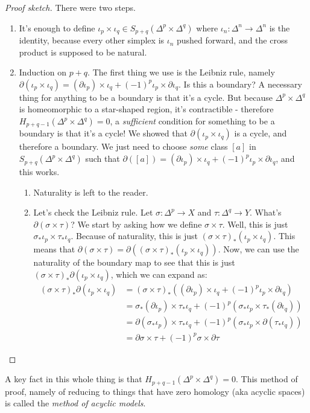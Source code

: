 \documentclass{amsart}
\theoremstyle{theorem}
\theoremstyle{definition}
\begin{document}
\begin{proof}[Proof sketch]
There were two steps.
\begin{enumerate}
\item It's enough to define $\iota_p\times \iota_q\in S_{p+q}(\Delta^p\times \Delta^q)$ where $\iota_n:\Delta^n\to\Delta^n$ is the identity, because every other simplex is $\iota_n$ pushed forward, and the cross product is supposed to be natural.
\item Induction on $p+q$. The first thing we use is the Leibniz rule, namely $\partial(\iota_p\times\iota_q) = (\partial\iota_p)\times\iota_q + (-1)^p\iota_p\times\partial\iota_q$. Is this a boundary? A necessary thing for anything to be a boundary is that it's a cycle. But because $\Delta^p\times\Delta^q$ is homeomorphic to a star-shaped region, it's contractible - therefore $ H_{p+q-1}(\Delta^p\times\Delta^q)=0$, a \emph{sufficient} condition for something to be a boundary is that it's a cycle! We showed that $\partial(\iota_p\times\iota_q)$ is a cycle, and therefore a boundary. We just need to choose \emph{some} class $[a]$ in $S_{p+q}(\Delta^p\times\Delta^q)$ such that $\partial([a])=(\partial\iota_p)\times\iota_q + (-1)^p\iota_p\times\partial\iota_q$, and this works.
\begin{enumerate}
\item Naturality is left to the reader.
\item Let's check the Leibniz rule. Let $\sigma:\Delta^p\to X$ and $\tau:\Delta^q\to Y$. What's $\partial(\sigma\times\tau)$? We start by asking how we define $\sigma\times \tau$. Well, this is just $\sigma_\ast\iota_p\times\tau_\ast\iota_q$. Because of naturality, this is just $(\sigma\times\tau)_\ast(\iota_p\times\iota_q)$. This means that $\partial(\sigma\times\tau)=\partial((\sigma\times\tau)_\ast(\iota_p\times\iota_q))$. Now, we can use the naturality of the boundary map to see that this is just $(\sigma\times\tau)_\ast\partial(\iota_p\times\iota_q)$, which we can expand as:
\begin{align*}
(\sigma\times\tau)_\ast\partial(\iota_p\times\iota_q)& =(\sigma\times\tau)_\ast((\partial\iota_p)\times\iota_q + (-1)^p\iota_p\times\partial\iota_q) \\
& = \sigma_\ast(\partial\iota_p)\times\tau_\ast\iota_q + (-1)^{p}(\sigma_\ast\iota_p\times\tau_\ast(\partial\iota_q))\\
& = \partial(\sigma_\ast\iota_p)\times\tau_\ast\iota_q + (-1)^{p}(\sigma_\ast\iota_p\times\partial(\tau_\ast\iota_q))\\
& = \partial\sigma\times\tau + (-1)^{p}\sigma\times\partial\tau
\end{align*}
\end{enumerate}
\end{enumerate}
\end{proof}
A key fact in this whole thing is that $ H_{p+q-1}(\Delta^p\times\Delta^q)=0$. This method of proof, namely of reducing to things that have zero homology (aka acyclic spaces) is called the \emph{method of acyclic models}.
\end{document}
